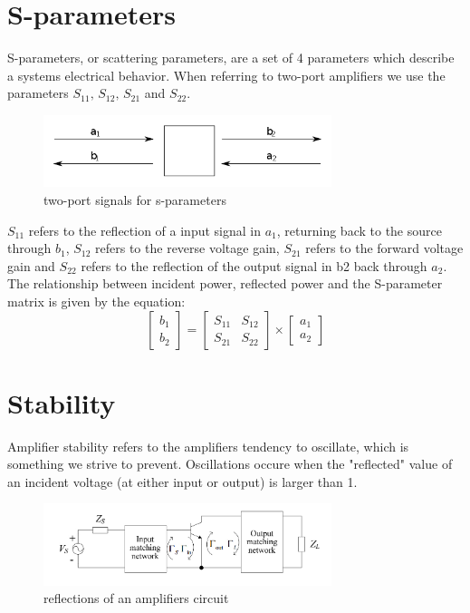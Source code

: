 \section{S-parameters}
S-parameters, or scattering parameters, are a set of 4 parameters which describe a systems electrical behavior. When referring to two-port amplifiers we use the parameters $S_{11},\, S_{12},\, S_{21}$ and $S_{22}$.
\begin{figure}[h]
	  \centering
	  \includegraphics[width=0.75\textwidth]{img/S_parameter_image}
	  \caption{two-port signals for s-parameters}
	  \label{fig:fig_sparam_vis}
\end{figure}
 $S_{11}$ refers to the reflection of a input signal in $a_1$, returning back to the source through $b_1$, $S_{12}$ refers to the reverse voltage gain, $S_{21}$ refers to the forward voltage gain and $S_{22}$ refers to the reflection of the output signal in b2 back through $a_2$.
 The relationship between incident power, reflected power and the S-parameter matrix is given by the equation:
 \begin{equation}
	\begin{bmatrix}
	b_1\\
	b_2
	\end{bmatrix}
	=
	\begin{bmatrix}
	S_{11} & S_{12}\\
	S_{21} & S_{22}
	\end{bmatrix}
	\times
	\begin{bmatrix}
	a_1\\
	a_2
	\end{bmatrix}
 \end{equation}

\section{Stability}
Amplifier stability refers to the amplifiers tendency to oscillate, which is something we strive to prevent. Oscillations occure when the "reflected" value of an incident voltage (at either input or output) is larger than 1.

\begin{figure}[H]
	  \centering
	  \includegraphics[width=0.75\textwidth]{img/Reflection_example}
	  \caption{reflections of an amplifiers circuit}
	  \label{fig:fig_reflection_ex}
\end{figure}

